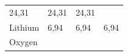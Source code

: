 {\begin{tabular}[t]{|l|l|l|l|}
    
        24,31 &
    
    
        24,31 &
    
    
        24,31%
     \tabularnewline\cline{1-1}\cline{2-2}\cline{3-3}\cline{4-4}
    
    
        Lithium &
    
    
        6,94 &
    
    
        6,94 &
    
    
        6,94%
     \tabularnewline\cline{1-1}\cline{2-2}\cline{3-3}\cline{4-4}
    
    
        Oxygen &
    

\end{tabular}}
